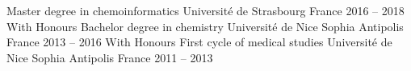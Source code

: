 

\begin{cventries}

  \cventryvar
    {Master degree in chemoinformatics}
    {Université de Strasbourg}
    {France}
    {2016 -- 2018}
    {\vspace{-1.2\baselineskip}With Honours}
  \vspace{1em}
  \cventryvar
    {Bachelor degree in chemistry}
    {Université de Nice Sophia Antipolis}
    {France}
    {2013 -- 2016}
    {\vspace{-1.2\baselineskip}With Honours}
  \vspace{1em}
  \cventryvar
    {First cycle of medical studies}
    {Université de Nice Sophia Antipolis}
    {France}
    {2011 -- 2013}
    {}
  

\end{cventries}

